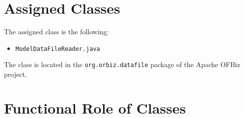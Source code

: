 

\section{Assigned Classes}
The assigned class is the following:
\begin{itemize}
\item \texttt{ModelDataFileReader.java}
\end{itemize}

\noindent
The class is located in the \texttt{org.orbiz.datafile} package of the Apache OFBiz project.

\section{Functional Role of Classes}
